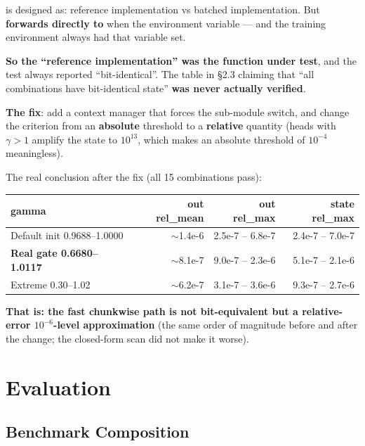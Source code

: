 \documentclass[11pt,openany]{article}
\begin{document}
 is designed as: reference implementation vs batched
implementation. But  \textbf{forwards directly to
} when the environment variable  ---
and the training environment always had that variable set.

\textbf{So the ``reference implementation'' was the function under test}, and the test always
reported ``bit-identical''. The table in  \S2.3 claiming that ``all combinations
have bit-identical state'' \textbf{was never actually verified}.

\textbf{The fix}: add a  context manager that forces the sub-module
switch, and change the criterion from an \textbf{absolute} threshold to a \textbf{relative}
quantity (heads with $\gamma > 1$ amplify the state to $10^{13}$, which makes an absolute
threshold of $10^{-4}$ meaningless).

The real conclusion after the fix (all 15 combinations pass):

\begin{center}\small
{}
\begin{tabular}{@{}>{\RaggedRight\arraybackslash}p{}rrr@{}}
\toprule
\textbf{gamma} & \textbf{out rel\_mean} & \textbf{out rel\_max} & \textbf{state rel\_max} \\
\midrule
Default init 0.9688--1.0000 & $\sim$1.4e-6 & 2.5e-7 -- 6.8e-7 & 2.4e-7 -- 7.0e-7 \\
\textbf{Real gate 0.6680--1.0117} & $\sim$8.1e-7 & 9.0e-7 -- 2.3e-6 & 5.1e-7 -- 2.1e-6 \\
Extreme 0.30--1.02 & $\sim$6.2e-7 & 3.1e-7 -- 3.6e-6 & 9.3e-7 -- 2.7e-6 \\
\bottomrule
\end{tabular}
\end{center}

\textbf{That is: the fast chunkwise path is not bit-equivalent but a relative-error
$10^{-6}$-level approximation} (the same order of magnitude before and after the change; the
closed-form scan did not make it worse).

\section{Evaluation}
\label{sec:en-eval}

\subsection{Benchmark Composition}
\end{document}
